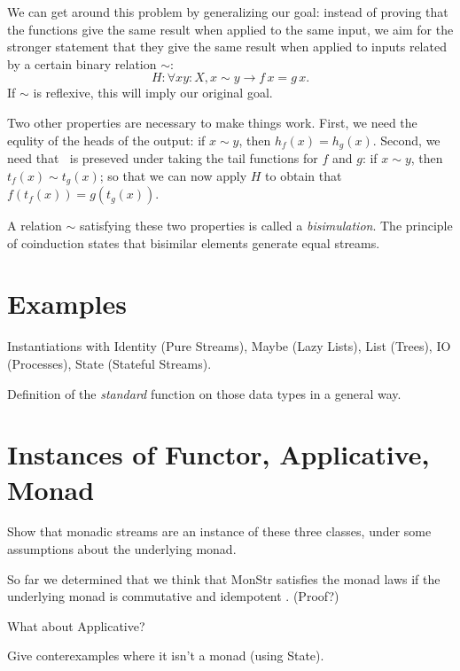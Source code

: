 \documentclass{article}
\begin{document}
We can get around this problem by generalizing our goal: instead of proving that the functions give the same result when applied to the same input, we aim for the stronger statement that they give the same result when applied to inputs related by a certain binary relation $\sim$:
$$
H: \forall x y:X, x\sim y \rightarrow f\,x = g\,x.
$$
If $\sim$ is reflexive, this will imply our original goal.

Two other properties are necessary to make things work.
First, we need the equlity of the heads of the output: if $x\sim y$, then $h_f(x) = h_g(x)$.
Second, we need that $~$ is preseved under taking the tail functions for $f$ and $g$: if $x\sim y$, then $t_f(x) \sim t_g(x)$; so that we can now apply $H$ to obtain that $f(t_f(x)) = g(t_g(x))$.

A relation $\sim$ satisfying these two properties is called a {\em bisimulation}.
The principle of coinduction states that bisimilar elements generate equal streams.



















\section{Examples}

Instantiations with Identity (Pure Streams), Maybe (Lazy Lists), List (Trees), IO (Processes), State (Stateful Streams).

Definition of the {\em standard} function on those data types in a general way.

\section{Instances of Functor, Applicative, Monad}

Show that monadic streams are an instance of these three classes, under some assumptions about the underlying monad.

So far we determined that we think that MonStr satisfies the monad laws if the underlying monad is commutative and idempotent \cite{idempotent_monads}. (Proof?)

What about Applicative?

Give conterexamples where it isn't a monad (using State).
\end{document}
